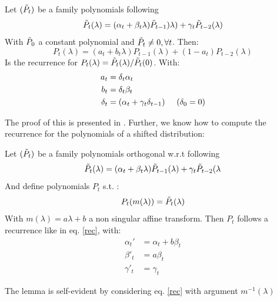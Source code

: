 \documentclass{article}
\begin{document}
\begin{lemma}
Let $(\Tilde{P}_t)$ be a family polynomials  following  
\begin{equation*}
    \Tilde{P}_t(\lambda)=(\alpha_t+\beta_t\lambda)\Tilde{P}_{t-1})\lambda)+\gamma_t\Tilde{P}_{t-2}(\lambda)
\end{equation*}
With $\Tilde{P}_0$ a constant polynomial and $\Tilde{P}_t\neq0, \forall t$. Then:
\begin{equation}
    P_t(\lambda)=(a_t+b_t\lambda)P_{t-1}(\lambda)+(1-a_t)P_{t-2}(\lambda)
\end{equation} Is the recurrence for $P_t(\lambda)=\Tilde{P}_t(\lambda)/\Tilde{P}_t(0)$. With:
\begin{align}
    a_t&=\delta_t\alpha_t \\
    b_t&=\delta_t\beta_t \\
    \delta_t&=(\alpha_t+\gamma_t\delta_{t-1}) \hspace{0.5 cm } (\delta_0=0)
\end{align}
\end{lemma}
The proof of this is presented in \cite{pedregosa2020acceleration}. Further, we know how to compute the recurrence for the polynomials of a shifted distribution:
\begin{lemma}

Let $(\Tilde{P}_t)$ be a family polynomials orthogonal w.r.t  following  
\begin{equation}    \label{rec}
    \Tilde{P}_t(\lambda)=(\alpha_t+\beta_t\lambda)\Tilde{P}_{t-1}(\lambda)+\gamma_t\Tilde{P}_{t-2}(\lambda
\end{equation}
And define polynomials $P_t$ s.t. :
$$
P_t(m(\lambda))=\Tilde{P}_t(\lambda)
$$
With $m(\lambda)=a\lambda+b$ a non singular affine transform. Then $P_t$ follows a recurrence like in eq. \eqref{rec}, with:
\begin{align}
    \alpha_t'&=\alpha_t+b\beta_t \\
    \beta'_t&=a\beta_t\\
    \gamma'_t&=\gamma_t
\end{align}
\end{lemma}
The lemma is self-evident by considering eq. \eqref{rec} with argument $m^{-1}(\lambda)$
\end{document}
